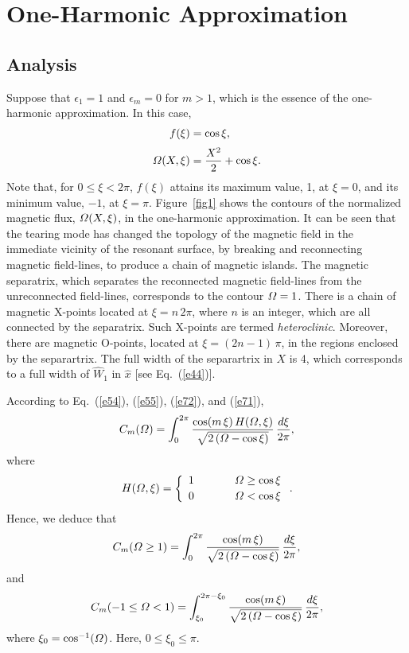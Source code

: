 \documentclass[12pt,prb,aps]{revtex4-1}
\begin{document}
\section{One-Harmonic Approximation}\label{s1}
\subsection{Analysis}
Suppose that $\epsilon_1=1$ and $\epsilon_m=0$ for $m>1$, which is the essence of the one-harmonic approximation.  In this case,
\begin{align}
f(\xi) &= \cos\xi,\label{e71}\\[0.5ex]
{\mit\Omega}(X,\xi) &= \frac{X^2}{2}+\cos\xi.
\end{align}
Note that, for $0\leq \xi < 2\pi$, $f(\xi)$ attains its maximum value, 1, at $\xi=0$, and its minimum value, $-1$, at $\xi=\pi$. 
Figure~\ref{fig1} shows the contours of the normalized magnetic flux, ${\mit\Omega}(X,\xi)$, in the one-harmonic approximation. It can be seen that the tearing mode has changed the
topology of the magnetic field in the immediate vicinity of the resonant surface, by breaking and reconnecting magnetic field-lines,  to produce a chain of magnetic islands. The magnetic
separatrix, which separates the reconnected magnetic field-lines from the unreconnected field-lines, corresponds to
the contour ${\mit\Omega}=1$. There is a chain of magnetic
X-points located at $\xi=n\,2\pi$, where $n$ is an integer, which are all connected by the separatrix.
 Such X-points are termed {\em heteroclinic}.  Moreover, there are magnetic O-points, located at $\xi=(2n-1)\,\pi$, in the regions enclosed by the separartrix. The full width of the separartrix in $X$ is 4, which corresponds to a full width
of $\hat{W}_1$ in $\hat{x}$ [see Eq.~(\ref{e44})]. 

According to Eq.~(\ref{e54}), (\ref{e55}), (\ref{e72}), and (\ref{e71}), 
\begin{equation}
 C_m({\mit\Omega})= \int_{0}^{2\pi}\frac{\cos(m\,\xi)\,H({\mit\Omega},\xi)}
 {\sqrt{2\left({\mit\Omega}-\cos\xi\right)}}\,\frac{d\xi}{2\pi},
 \end{equation}
 where
 \begin{equation}
 H({\mit\Omega},\xi) = \left\{
 \begin{array}{ccc} 1&~~~~~&{\mit\Omega}\geq \cos\xi\\[0.5ex]
 0 &&{\mit\Omega}< \cos\xi\end{array}\right..
 \end{equation}
 Hence, we deduce that
 \begin{equation}
 C_m({\mit\Omega}\geq 1)= \int_{0}^{2\pi}\frac{\cos(m\,\xi)}
 {\sqrt{2\left({\mit\Omega}-\cos\xi\right)}}\,\frac{d\xi}{2\pi},
\end{equation}
and 
 \begin{equation}
C_m(-1\leq {\mit\Omega}<1)= \int_{\xi_0}^{2\pi-\xi_0}\frac{\cos(m\,\xi)}
 {\sqrt{2\left({\mit\Omega}-\cos\xi\right)}}\,\frac{d\xi}{2\pi}, 
\end{equation}
 where
$\xi_0=\cos^{-1}({\mit\Omega})$. 
Here, $0\leq \xi_0\leq \pi$. 
\end{document}
